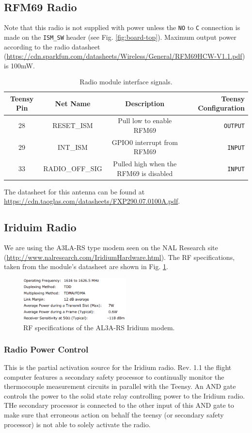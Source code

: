 \documentclass{article}
\begin{document}
\subsection{RFM69 Radio}
Note that this radio is not supplied with power unless the \texttt{NO} to \texttt{C} connection is made on the \texttt{ISM\_SW} header (see Fig. \ref{fig:board-top}).  Maximum output power according to the radio datasheet (\url{https://cdn.sparkfun.com/datasheets/Wireless/General/RFM69HCW-V1.1.pdf}) is 100mW.
\begin{table}[H]
    \centering
    \begin{tabular}{c|c|c|r}
    Teensy Pin & Net Name  & Description   & Teensy Configuration \\
    \hline 
    28 & RESET\_ISM  &  Pull low to enable RFM69   & \texttt{OUTPUT} \\
    29 & INT\_ISM    &  GPIO0 interrupt from RFM69 & \texttt{INPUT} \\
    33 & RADIO\_OFF\_SIG & Pulled high when the RFM69 is disabled & \texttt{INPUT} \\
    \end{tabular}
    \caption{Radio module interface signals.}
    \label{tab:pins_radio}
\end{table}
The datasheet for this antenna can be found at  \url{https://cdn.taoglas.com/datasheets/FXP290.07.0100A.pdf}. 

\subsection{Iriduim Radio}
We are using the A3LA-RS type modem seen on the NAL Research site (\url{http://www.nalresearch.com/IridiumHardware.html}). The RF specifications, taken from the module's datasheet are shown in Fig. \ref{fig:iridium-rf-specs}.

\begin{figure}[H]
    \centering
    \includegraphics[width=0.5\textwidth]{images/iridium-rf-specs.png}
    \caption{RF specifications of the AL3A-RS Iridium modem.}
    \label{fig:iridium-rf-specs}
\end{figure}
  
\subsubsection{Radio Power Control}
This is the partial activation source for the Iridium radio. Rev. 1.1 the flight computer features a secondary safety processor to continually monitor the thermocouple measurement circuits in parallel with the Teensy. An AND gate controls the power to the solid state relay controlling power to the Iridium radio. THe secondary processor is connected to the other input of this AND gate to make sure that erroneous action on behalf the teensy (or secondary safety processor) is not able to solely activate the radio. 
\end{document}
